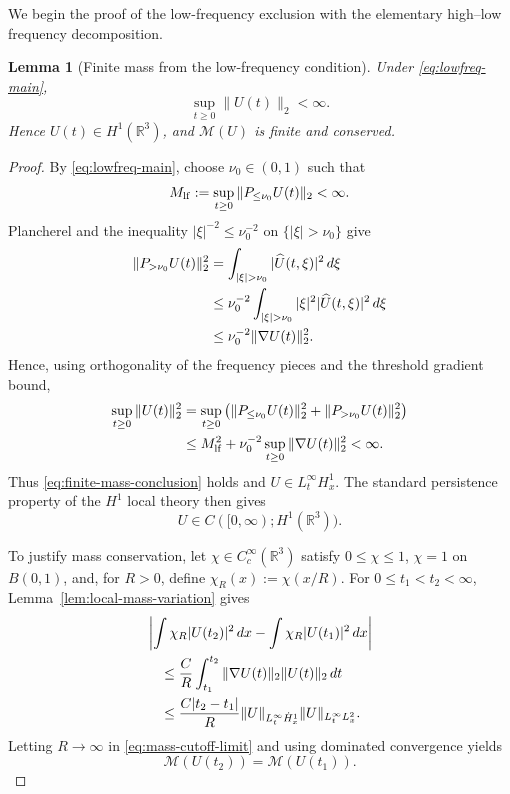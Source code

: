 \documentclass[preprint,12pt]{elsarticle}
\numberwithin{equation}{section}
\newtheorem{lemma}[theorem]{Lemma}
\theoremstyle{remark}
\newcommand{\R}{\mathbb R}
\newcommand{\dd}{\,d}
\newcommand{\Mcal}{\mathcal M}
\begin{document}
We begin the proof of the low-frequency exclusion with the elementary high--low frequency decomposition.

\begin{lemma}[Finite mass from the low-frequency condition]\label{lem:lowfreq-finite-mass}
Under \eqref{eq:lowfreq-main},
\begin{equation}\label{eq:finite-mass-conclusion}
  \sup_{t\ge0}\|U(t)\|_2<\infty.
\end{equation}
Hence $U(t)\in H^1(\R^3)$, and $\Mcal(U)$ is finite and conserved.
\end{lemma}

\begin{proof}
By \eqref{eq:lowfreq-main}, choose $\nu_0\in(0,1)$ such that
\begin{equation*}
  M_{\rm lf}:=\sup_{t\ge0}\|P_{\le\nu_0}U(t)\|_2<\infty.
\end{equation*}
Plancherel and the inequality $|\xi|^{-2}\le\nu_0^{-2}$ on $\{|\xi|>\nu_0\}$ give
\begin{align*}
  \|P_{>\nu_0}U(t)\|_2^2
  &=\int_{|\xi|>\nu_0}|\widehat U(t,\xi)|^2\dd\xi\notag\\
  &\le\nu_0^{-2}
  \int_{|\xi|>\nu_0}|\xi|^2|\widehat U(t,\xi)|^2\dd\xi\notag\\
  &\le\nu_0^{-2}\|\nabla U(t)\|_2^2.
\end{align*}
Hence, using orthogonality of the frequency pieces and the threshold gradient bound,
\begin{align*}
  \sup_{t\ge0}\|U(t)\|_2^2
  &=\sup_{t\ge0}
  \left(\|P_{\le\nu_0}U(t)\|_2^2
  +\|P_{>\nu_0}U(t)\|_2^2\right)\notag\\
  &\le M_{\rm lf}^2
  +\nu_0^{-2}\sup_{t\ge0}\|\nabla U(t)\|_2^2
  <\infty.
\end{align*}
Thus \eqref{eq:finite-mass-conclusion} holds and $U\in L_t^\infty H_x^1$. The standard persistence property of the $H^1$ local theory then gives
\begin{equation*}
  U\in C([0,\infty);H^1(\R^3)).
\end{equation*}

To justify mass conservation, let $\chi\in C_c^\infty(\R^3)$ satisfy $0\le\chi\le1$, $\chi=1$ on $B(0,1)$, and, for $R>0$, define $\chi_R(x):=\chi(x/R)$. For $0\le t_1<t_2<\infty$, Lemma~\ref{lem:local-mass-variation} gives
\begin{align}
 &\left|\int\chi_R|U(t_2)|^2\dd x
  -\int\chi_R|U(t_1)|^2\dd x\right|\notag\\
 &\quad\le\frac{C}{R}
  \int_{t_1}^{t_2}\|\nabla U(t)\|_2\|U(t)\|_2\dd t\notag\\
 &\quad\le\frac{C|t_2-t_1|}{R}
  \|U\|_{L_t^\infty\dot H_x^1}
  \|U\|_{L_t^\infty L_x^2}.
  \label{eq:mass-cutoff-limit}
\end{align}
Letting $R\to\infty$ in \eqref{eq:mass-cutoff-limit} and using dominated convergence yields
\[
  \Mcal(U(t_2))=\Mcal(U(t_1)).
\]
\end{proof}
\end{document}
